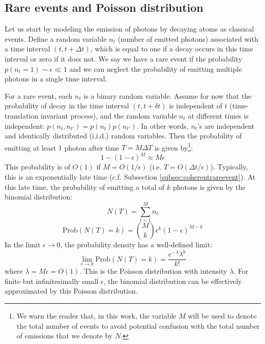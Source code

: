 \documentclass[a4paper,11pt]{article}
\theoremstyle{definition}
\numberwithin{equation}{section}
\newcommand{\NL}[1]{\textcolor{blue}{#1}}
\begin{document}
\subsection{Rare events and Poisson distribution}\label{subsec:rareevents}


Let us start by modeling the emission of photons by decaying atoms as classical events. Define a random variable $n_t$ (number of emitted photons) associated with a time interval $(t,t+\Delta t)$, which is equal to one if a decay occurs in this time interval or zero if it does not. We say we have a rare event if the probability $p(n_t=1)\sim \epsilon\ll 1$ and we can neglect the probability of emitting multiple photons in a single time interval.

For a rare event, each $n_t$ is a binary random variable. Assume for now that the probability of decay in the time interval $(t, t+\delta t)$ is independent of $t$ (time-translation invariant process), and the random variable $n_t$ at different times is independent: $p(n_t, n_{t'}) = p(n_t)p(n_{t'})$. In other words, $n_t$'s are independent and identically distributed (i.i.d.) random variables. Then the probability of emitting at least $1$ photon after time $T = M\Delta T$ is given by\footnote{We warn the reader that, in this work, the variable $M$ will be used to denote the total number of events to avoid potential confusion with the total number of emissions that we denote by $N$.}:
\begin{equation}
    1 - (1 - \epsilon)^{M} \approx M\epsilon
\end{equation}
This probability is of $O(1)$ if $M = O(1/\epsilon)$ (i.e. $T = O(\Delta t / \epsilon)$). Typically, this is an exponentially late time (c.f. Subsection \ref{subsec:coherentrareevent}). At this late time, the probability of emitting a total of $k$ photons is given by the binomial distribution:
\begin{equation}
    N(T) = \sum_{t = 1}^{M} n_t
\end{equation}
\begin{equation}
    \text{Prob}(N(T) = k) = \binom{M}{k}\epsilon^k(1 - \epsilon)^{M - k}
\end{equation}
In the limit $\epsilon \rightarrow 0$, the probability density has a well-defined limit:
\begin{equation}
    \lim_{\epsilon\rightarrow 0}\text{Prob}(N(T) = k) = \frac{e^{-\lambda}\lambda^k}{k!}
\end{equation}
where $\lambda = M\epsilon = O(1)$. This is the Poisson distribution with intensity $\lambda$. For finite but infinitesimally small $\epsilon$, the binomial distribution can be effectively approximated by this Poisson distribution.
\end{document}
